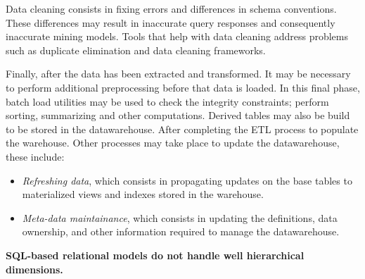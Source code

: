 \documentclass[]{article}
\begin{document}
Data cleaning consists in fixing errors and differences in schema conventions. These differences may result in inaccurate query
responses and consequently inaccurate mining models. Tools that help with data cleaning address problems such as duplicate elimination
and data cleaning frameworks.

Finally, after the data has been extracted and transformed. It may be necessary to perform additional preprocessing before that data is
loaded. In this final phase, batch load utilities may be used to check the integrity constraints; perform sorting, summarizing and other
computations. Derived tables may also be build to be stored in the datawarehouse. After completing the ETL process to populate the
warehouse. Other processes may take place to update the datawarehouse, these include:
\begin{itemize}
	\item \emph{Refreshing data}, which consists in propagating updates on the base tables to materialized views and indexes stored in the warehouse.
	\item \emph{Meta-data maintainance}, which consists in updating the definitions, data ownership, and other information required to manage the datawarehouse. 
\end{itemize}


\textbf{SQL-based
relational models do not handle well hierarchical dimensions.}




\end{document}
